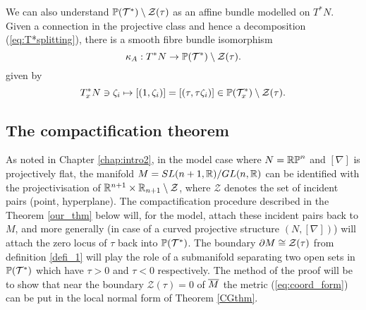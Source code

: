 \begin{rmk} We can also understand $\mathbb{P}(\mathcal{T}^*)\setminus \mathcal{Z}(\tau)$ as an affine bundle modelled on $T^* N$. Given a connection in the projective class and hence a decomposition (\ref{eq:T*splitting}), there is a smooth fibre bundle isomorphism
  \begin{equation}\label{key-id}
\kappa_A : T^* N\to \mathbb{P}(\mathcal{T}^*)\setminus \mathcal{Z}(\tau).
    \end{equation}
%
given by
\begin{equation} \label{eq:T*N_is_M}
T_x^*N\ni \zeta_i  \mapsto [(1,\zeta_i)]=[(\tau,\tau \zeta_i)]\in
\mathbb{P}(\mathcal{T}_x^*)\setminus \mathcal{Z}(\tau) .
\end{equation}
\end{rmk}


\subsection{The compactification theorem}

As noted in Chapter \ref{chap:intro2}, in the model case where $N=\mathbb{RP}^n$ and $[\nabla]$ is projectively flat, the manifold $M=SL(n+1, \mathbb{R})/GL(n, \mathbb{R})$ can be identified with the projectivisation of $\mathbb{R}^{n+1}\times \mathbb{R}_{n+1}\setminus {\mathcal Z}$, where ${\mathcal Z}$ denotes the set of incident pairs (point, hyperplane). The compactification procedure described in the Theorem \ref{our_thm} below will, for the model, attach these incident pairs back to $M$, and more generally (in case of a curved projective structure $(N,[\nabla])$) will attach the zero locus of $\tau$ back into $\mathbb{P}(\mathcal{T}^*)$. The boundary $\partial M \cong \mathcal{Z}(\tau)$ from definition \ref{defi_1} will play the role of a submanifold
separating two open sets in $\mathbb{P}(\mathcal{T}^*)$ which have $\tau>0$ and $\tau<0$ respectively. The method of the proof will be to show that near
the boundary ${\mathcal{Z}}(\tau)=0$ of $\overline{M}$ the metric 
(\ref{eq:coord_form}) can be put in the local normal form of Theorem 
\ref{CGthm}.

